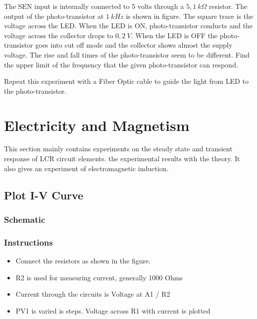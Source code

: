 \documentclass[a4paper,12pt,english]{sphinxmanual}
\let\sphinxpxdimen\pdfpxdimen\else\newdimen\sphinxpxdimen
\begin{document}

The SEN input is internally connected to 5 volts through a \(5,1~k\Omega\)
resistor. The output of the photo-transistor at \(1~kHz\) is shown in figure.
The square trace is the voltage across the LED. When the LED is ON,
photo-transistor conducts and the voltage across the collector drops to
\(0,2~V\). When the LED is OFF the photo-transistor goes into cut off
mode and the collector shows almost the supply voltage. The rise and
fall times of the photo-transistor seem to be different. Find the upper
limit of the frequency that the given photo-transistor can respond.

Repeat this experiment with a Fiber Optic cable to guide the light from
LED to the photo-transistor.


\chapter{Electricity and Magnetism}
\label{\detokenize{index:electricity-and-magnetism}}
This section mainly contains experiments on the steady state and
transient response of LCR circuit elements. the experimental results
with the theory. It also gives an experiment of electromagnetic
induction.


\section{Plot I-V Curve}
\label{\detokenize{4.01:plot-i-v-curve}}\label{\detokenize{4.01::doc}}

\subsection{Schematic}
\label{\detokenize{4.01:schematic}}
\noindent\sphinxincludegraphics[width=300\sphinxpxdimen]{{res-compare}.pdf}


\subsection{Instructions}
\label{\detokenize{4.01:instructions}}\begin{itemize}
\item {} 
Connect the resistors as shown in the figure.

\item {} 
R2 is used for measuring current, generally 1000 Ohms

\item {} 
Current through the circuits is Voltage at A1 / R2

\item {} 
PV1 is varied is steps. Voltage across R1 with current is plotted

\end{itemize}
\end{document}
